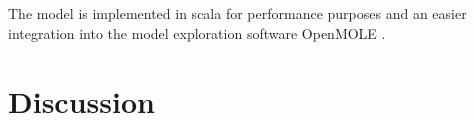 \documentclass[a4paper,twocolumn,twoside,10pt]{article}
\theoremstyle{definition}
\begin{document}
The model is implemented in scala for performance purposes and an easier integration into the model exploration software OpenMOLE \cite{reuillon2013openmole}.



\section{Discussion}




\footnotesize




\end{document}
